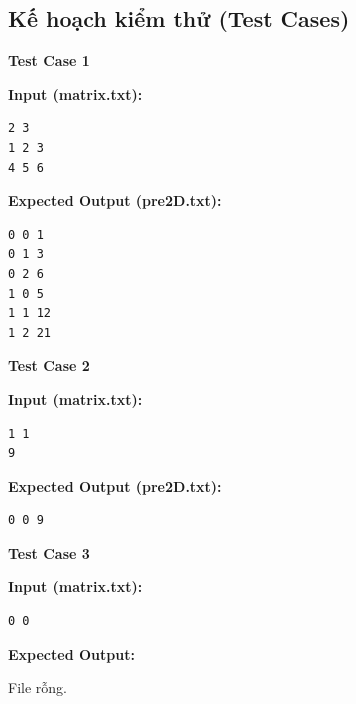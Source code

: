 \subsection{Kế hoạch kiểm thử (Test Cases)}

\textbf{Test Case 1}

\textbf{Input (matrix.txt):}
\begin{lstlisting}
2 3
1 2 3
4 5 6
\end{lstlisting}

\textbf{Expected Output (pre2D.txt):}
\begin{lstlisting}
0 0 1
0 1 3
0 2 6
1 0 5
1 1 12
1 2 21
\end{lstlisting}

\textbf{Test Case 2}

\textbf{Input (matrix.txt):}
\begin{lstlisting}
1 1
9
\end{lstlisting}

\textbf{Expected Output (pre2D.txt):}
\begin{lstlisting}
0 0 9
\end{lstlisting}

\textbf{Test Case 3}

\textbf{Input (matrix.txt):}
\begin{lstlisting}
0 0
\end{lstlisting}

\textbf{Expected Output:}

File rỗng.